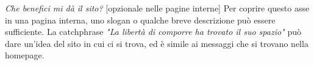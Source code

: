 \textit{Che benefici mi dà il sito?} [opzionale nelle pagine interne] \newline
Per coprire questo asse in una pagina interna, uno slogan o qualche breve descrizione può essere sufficiente. La catchphrase \textit{"La libertà di comporre ha trovato il suo spazio"} può dare un'idea del sito in cui ci si trova, ed è simile ai messaggi che si trovano nella homepage.